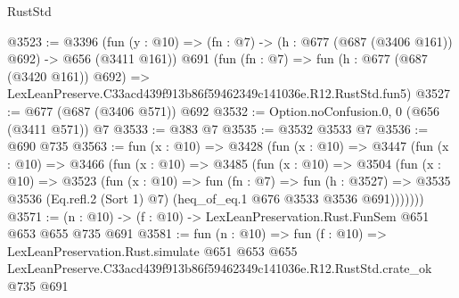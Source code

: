 \begin{lexlean}{RustStd}
\begin{coremodule}
@3523 := @3396
    (fun (y : @10) => (fn : @7) -> (h : @677 (@687 (@3406 @161)) @692) -> @656 (@3411 @161))
    @691
    (fun (fn : @7) =>
    fun (h : @677 (@687 (@3420 @161)) @692) =>
    LexLeanPreserve.C33acd439f913b86f59462349c141036e.R12.RustStd.fun5)
@3527 := @677 (@687 (@3406 @571)) @692
@3532 := Option.noConfusion.{0, 0} (@656 (@3411 @571)) @7
@3533 := @383 @7
@3535 := @3532 @3533 @7
@3536 := @690 @735
@3563 := fun (x : @10) =>
  @3428
    (fun (x : @10) =>
    @3447
      (fun (x : @10) =>
      @3466
        (fun (x : @10) =>
        @3485
          (fun (x : @10) =>
          @3504
            (fun (x : @10) =>
            @3523
              (fun (x : @10) =>
              fun (fn : @7) =>
              fun (h : @3527) =>
              @3535 @3536 (Eq.refl.{2} (Sort 1) @7) (heq_of_eq.{1} @676 @3533 @3536 @691)))))))
@3571 := (n : @10) -> (f : @10) -> LexLeanPreservation.Rust.FunSem @651 @653 @655 @735 @691
@3581 := fun (n : @10) =>
  fun (f : @10) =>
  LexLeanPreservation.Rust.simulate
    @651
    @653
    @655
    LexLeanPreserve.C33acd439f913b86f59462349c141036e.R12.RustStd.crate_ok
    @735
    @691
\end{coremodule}
\end{lexlean}
